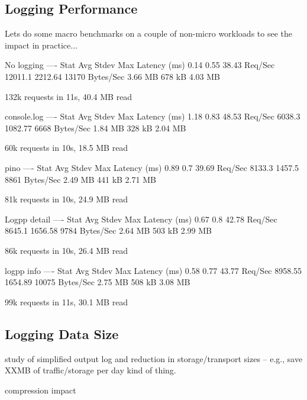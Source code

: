 \subsection{Logging Performance}
Lets do some macro benchmarks on a couple of non-micro workloads to see the 
impact in practice...

No logging
----
Stat         Avg     Stdev   Max
Latency (ms) 0.14    0.55    38.43
Req/Sec      12011.1 2212.64 13170
Bytes/Sec    3.66 MB 678 kB  4.03 MB

132k requests in 11s, 40.4 MB read

console.log
----
Stat         Avg     Stdev   Max
Latency (ms) 1.18    0.83    48.53
Req/Sec      6038.3  1082.77 6668
Bytes/Sec    1.84 MB 328 kB  2.04 MB

60k requests in 10s, 18.5 MB read

pino         
----
Stat         Avg     Stdev  Max
Latency (ms) 0.89    0.7    39.69
Req/Sec      8133.3  1457.5 8861
Bytes/Sec    2.49 MB 441 kB 2.71 MB

81k requests in 10s, 24.9 MB read

Logpp detail 
----
Stat         Avg     Stdev   Max
Latency (ms) 0.67    0.8     42.78
Req/Sec      8645.1  1656.58 9784
Bytes/Sec    2.64 MB 503 kB  2.99 MB

86k requests in 10s, 26.4 MB read

logpp info   
----
Stat         Avg     Stdev   Max
Latency (ms) 0.58    0.77    43.77
Req/Sec      8958.55 1654.89 10075
Bytes/Sec    2.75 MB 508 kB  3.08 MB

99k requests in 11s, 30.1 MB read

\subsection{Logging Data Size}

study of simplified output log and reduction in storage/transport sizes -- 
e.g., save XXMB of traffic/storage per day kind of thing.

compression impact
